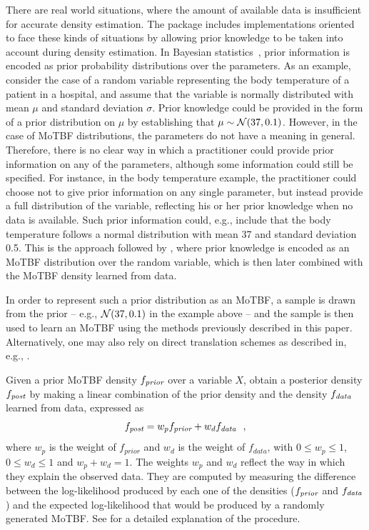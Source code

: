 There are real world situations, where the amount of available data is insufficient for 
accurate density estimation. The  package includes implementations oriented
to face these kinds of situations by allowing prior knowledge to be taken into account during density estimation.
In Bayesian statistics~\citep{Ber09}, prior information is encoded as prior probability distributions over the parameters. 
As an example, consider the case of a random variable representing the body temperature of a patient in a hospital,
and assume that the variable is normally distributed with mean $\mu$ and standard deviation $\sigma$. Prior knowledge could 
be provided in the form of a prior distribution on $\mu$ by establishing that $\mu \sim {\cal N}(37,0.1)$.
However, in the case of MoTBF distributions, the parameters do not have a meaning in general. Therefore, 
there is no clear way in which a practitioner could provide prior information on any of the parameters,
although some 
information could still be specified. For instance, in the body temperature example, the practitioner could choose not to give 
prior information on any single parameter,  but instead provide a full distribution of the variable, reflecting
his or her prior knowledge when no data is available. Such prior information could, e.g., include that the body temperature follows  
a normal distribution with mean 37 and standard deviation 0.5. This is the approach followed by \cite{Per15}, where prior
knowledge is encoded as an MoTBF distribution over the random variable, which is then later combined
with the MoTBF density learned from data.  

In order to represent such a prior distribution as an MoTBF, a sample is drawn from the prior -- e.g., ${\cal N}(37,0.1)$
in the example above -- and the sample is then used to learn an MoTBF using the methods previously described in
this paper. Alternatively, one may also rely on direct translation schemes as described in, e.g., \citep{Lan10,Cob06}.   

Given a prior MoTBF density $f_{\emph{prior}}$ over a variable $X$, \cite{Per15} obtain a posterior density
$f_{\emph{post}}$ by making a linear
combination of the prior density and the density $f_{\emph{data}}$ learned from data, expressed as
\[
f_{\emph{post}}  = w_{p} f_{\emph{prior}} + w_{d} f_{\emph{data}}\ \ , 
\]
where $w_{p}$ is the weight of $f_{prior}$ and $w_{d}$ is the weight of $f_{data}$, with 
$0\leq w_{p} \leq 1$, $0\leq w_{d} \leq 1$ and $w_p+w_d=1$. The weights $w_p$ and $w_d$ 
reflect the way in which they explain the observed data. They are computed by measuring the difference between the
log-likelihood produced by each one of the densities ($f_{\emph{prior}}$ and $f_{\emph{data}}$) and 
the expected log-likelihood that would be produced by a randomly generated MoTBF.
See \citep{Per15} for a detailed explanation of the procedure.


